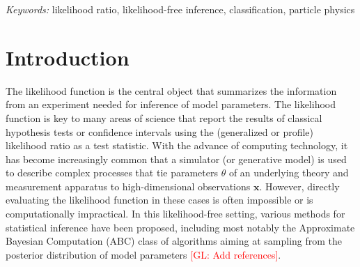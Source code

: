 \documentclass[12pt]{article}
\numberwithin{equation}{section}
\theoremstyle{plain}
\newcommand{\glnote}[1]{\textcolor{red}{[GL: #1]}}
\begin{document}
\noindent%
{\it Keywords:}  likelihood ratio, likelihood-free inference, classification, particle physics
\vfill

\newpage
{} %




\section{Introduction}
\label{sec:introduction}


The likelihood function is the central object that summarizes the information
from an experiment needed for inference of model parameters. The likelihood
function is key to many areas of science that report the results of classical
hypothesis tests or confidence intervals using the (generalized or profile)
likelihood ratio as a test statistic. With the advance of computing technology,
it has become increasingly common that a simulator (or generative model) is used
to describe complex processes that tie parameters $\theta$ of an underlying
theory and measurement apparatus to high-dimensional observations $\mathbf{x}$. However,
directly evaluating the likelihood function in these cases is often impossible
or is computationally impractical. In this likelihood-free setting, various
methods for statistical inference have been proposed, including most notably the
Approximate Bayesian Computation (ABC) class of algorithms aiming at sampling
from the posterior distribution of model parameters \glnote{Add references}.
\end{document}
